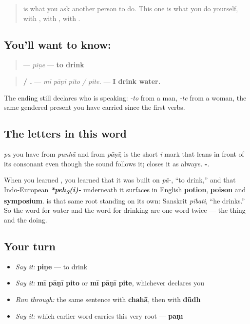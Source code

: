 \label{lesson:MR-C22-pine}



\begin{quote}
\textbf{} is what you ask another person to do. This one is what you do yourself, with \textbf{}, with \textbf{}, with \textbf{}.
\end{quote}

\subsection*{You'll want to know: }
\begin{quote}
\textbf{} — \emph{piṇe} — \textbf{to drink}
\end{quote}

\begin{quote}
\textbf{   / .} — \emph{mī pāṇī pito / pite.} — \textbf{I drink water.}
\end{quote}

The ending still declares who is speaking: \emph{-to} from a man, \emph{-te} from a woman, the same gendered present you have carried since the first verbs.

\subsection*{The letters in this word}
\textbf{} \emph{pa} you have from \emph{punhā} and from \emph{pāṇī}; \textbf{} is the short \emph{i} mark that leans in front of its consonant even though the sound follows it; \textbf{} closes it as always. \textbf{-}.

\begin{cousinweb}
When you learned \textbf{}, you learned that it was built on \textbf{} \emph{pā-}, \textquotedblleft{}to drink,\textquotedblright{} and that Indo-European \emph{\textbf{*peh\textsubscript{3}(i)-}} underneath it surfaces in English \textbf{potion}, \textbf{poison} and \textbf{symposium}. \textbf{} is that same root standing on its own: Sanskrit \textbf{} \emph{pibati}, \textquotedblleft{}he drinks.\textquotedblright{} So the word for water and the word for drinking are one word twice — the thing and the doing.
\end{cousinweb}

\subsection*{Your turn}
\begin{itemize}
\raggedright
  \item \emph{Say it:} \textbf{piṇe} — to drink
  \item \emph{Say it:} \textbf{mī pāṇī pito} or \textbf{mī pāṇī pite}, whichever declares you
  \item \emph{Run through:} the same sentence with \textbf{chahā}, then with \textbf{dūdh}
  \item \emph{Say it:} which earlier word carries this very root — \textbf{pāṇī}
\end{itemize}

